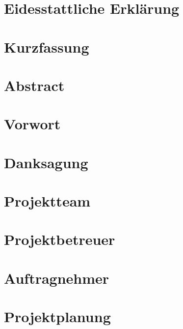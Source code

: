 \documentclass[12pt]{article}
\begin{document}


\section*{Eidesstattliche Erklärung}

\pagebreak

\section*{Kurzfassung}

\pagebreak

\section*{Abstract}

\pagebreak

\section*{Vorwort}

\pagebreak

\section*{Danksagung}

\pagebreak
{}

\tableofcontents
\pagebreak

\setcounter{page}{1}

\section{Projektteam}

\pagebreak

\section{Projektbetreuer}
\pagebreak

\section{Auftragnehmer}
\pagebreak

\section{Projektplanung}
\pagebreak
\end{document}

